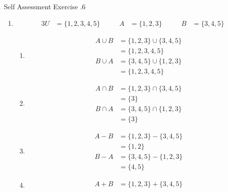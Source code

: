 \documentclass[../notes.tex]{subfiles}
\begin{document}
      \begin{exercise}{Self Assessment Exercise \thechapter.6}
        \begin{enumerate}
          \item \rule{0pt}{11pt} \vspace*{-25pt}
            \begin{alignat*}{3}
              U &= \{1, 2, 3, 4, 5\} \qquad & A &= \{1, 2, 3\} \qquad & B &= \{3, 4, 5\}
            \end{alignat*}
            \begin{enumerate}[label=(\alph*)]
              \item \rule{0pt}{11pt} \vspace*{-25pt}
                \begin{align*}
                  A \cup B &= \{1, 2, 3\} \cup \{3, 4, 5\}\\
                  &= \{1, 2, 3, 4, 5\}\\
                  B \cup A &= \{3, 4, 5\} \cup \{1, 2, 3\}\\
                  &= \{1, 2, 3, 4, 5\}
                \end{align*}
              \item \rule{0pt}{11pt} \vspace*{-25pt}
                \begin{align*}
                  A \cap B &= \{1, 2, 3\} \cap \{3, 4, 5\}\\
                  &= \{3\}\\
                  B \cap A &= \{3, 4, 5\} \cap \{1, 2, 3\}\\
                  &= \{3\}
                \end{align*}
              \item \rule{0pt}{11pt} \vspace*{-25pt}
                \begin{align*}
                  A - B &= \{1, 2, 3\} - \{3, 4, 5\}\\
                  &= \{1, 2\}\\
                  B - A &= \{3, 4, 5\} - \{1, 2, 3\}\\
                  &= \{4, 5\}
                \end{align*}
              \item \rule{0pt}{11pt} \vspace*{-25pt}
                \begin{align*}
                  A + B &= \{1, 2, 3\} + \{3, 4, 5\}\\

\end{align*}
\end{enumerate}
\end{enumerate}
\end{exercise}
\end{document}

